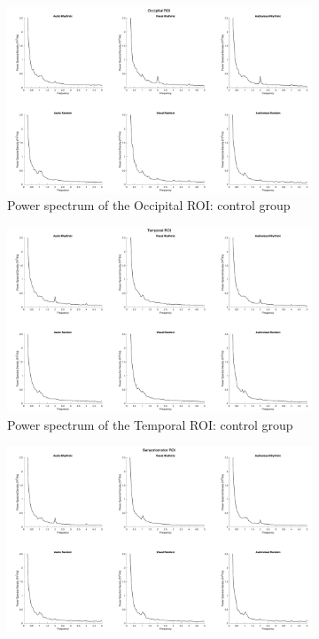 \begin{figure}[htbp]
    \begin{subfigure}[htbp]{0.45\textwidth}
        \includegraphics[width=\textwidth]{healthy_images/occipitalROI_graph.png}
        \caption{Power spectrum of the Occipital ROI: control group}
        \label{fig: Waveforms control: occipital} 
    \end{subfigure}  
    \hfill
    \begin{subfigure}[htbp]{0.45\textwidth}
        \includegraphics[width=\textwidth]{healthy_images/temporalROI_graph.png}
        \caption{Power spectrum of the Temporal ROI: control group}
        \label{fig: Waveforms control: temporal}   
    \end{subfigure}
    \hfill
    \begin{subfigure}[htbp]{0.45\textwidth}
        \includegraphics[width=\textwidth]{healthy_images/sensorimotorROI_graph.png}

\end{subfigure}
\end{figure}
